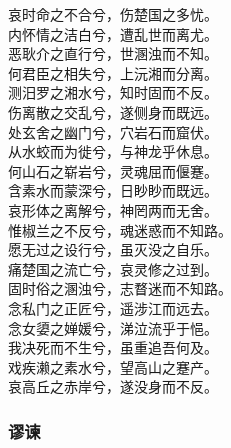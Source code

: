 \documentclass[]{article}
\begin{document}
哀时命之不合兮，伤楚国之多忧。\\
内怀情之洁白兮，遭乱世而离尤。\\
恶耿介之直行兮，世溷浊而不知。\\
何君臣之相失兮，上沅湘而分离。\\
测汨罗之湘水兮，知时固而不反。\\
伤离散之交乱兮，遂侧身而既远。\\
处玄舍之幽门兮，穴岩石而窟伏。\\
从水蛟而为徙兮，与神龙乎休息。\\
何山石之崭岩兮，灵魂屈而偃蹇。\\
含素水而蒙深兮，日眇眇而既远。\\
哀形体之离解兮，神罔两而无舍。\\
惟椒兰之不反兮，魂迷惑而不知路。\\
愿无过之设行兮，虽灭没之自乐。\\
痛楚国之流亡兮，哀灵修之过到。\\
固时俗之溷浊兮，志瞀迷而不知路。\\
念私门之正匠兮，遥涉江而远去。\\
念女嬃之婵媛兮，涕泣流乎于悒。\\
我决死而不生兮，虽重追吾何及。\\
戏疾濑之素水兮，望高山之蹇产。\\
哀高丘之赤岸兮，遂没身而不反。

\hypertarget{header-n255}{%
\subsubsection{谬谏}\label{header-n255}}
\end{document}
